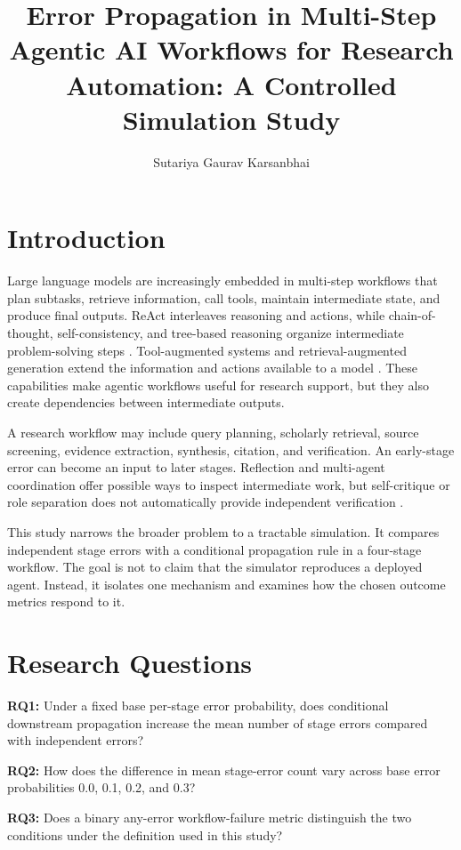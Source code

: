 \documentclass[sigconf,nonacm]{acmart}
\title{Error Propagation in Multi-Step Agentic AI Workflows for Research Automation: A Controlled Simulation Study}
\author{Sutariya Gaurav Karsanbhai}
\affiliation{\institution{Indian Institute of Information Technology Allahabad}\city{Prayagraj}\state{Uttar Pradesh}\country{India}}
\begin{document}
\maketitle
\section{Introduction}
Large language models are increasingly embedded in multi-step workflows that plan subtasks, retrieve information, call tools, maintain intermediate state, and produce final outputs. ReAct interleaves reasoning and actions, while chain-of-thought, self-consistency, and tree-based reasoning organize intermediate problem-solving steps \cite{yao2023react,wei2022cot,wang2023selfconsistency,yao2023tot}. Tool-augmented systems and retrieval-augmented generation extend the information and actions available to a model \cite{schick2023toolformer,qin2024toolllm,lewis2020rag,asai2024selfrag}. These capabilities make agentic workflows useful for research support, but they also create dependencies between intermediate outputs.

A research workflow may include query planning, scholarly retrieval, source screening, evidence extraction, synthesis, citation, and verification. An early-stage error can become an input to later stages. Reflection and multi-agent coordination offer possible ways to inspect intermediate work, but self-critique or role separation does not automatically provide independent verification \cite{shinn2023reflexion,wu2024autogen,hong2024metagpt}.

This study narrows the broader problem to a tractable simulation. It compares independent stage errors with a conditional propagation rule in a four-stage workflow. The goal is not to claim that the simulator reproduces a deployed agent. Instead, it isolates one mechanism and examines how the chosen outcome metrics respond to it.

\section{Research Questions}
\textbf{RQ1:} Under a fixed base per-stage error probability, does conditional downstream propagation increase the mean number of stage errors compared with independent errors?

\textbf{RQ2:} How does the difference in mean stage-error count vary across base error probabilities 0.0, 0.1, 0.2, and 0.3?

\textbf{RQ3:} Does a binary any-error workflow-failure metric distinguish the two conditions under the definition used in this study?
\end{document}

